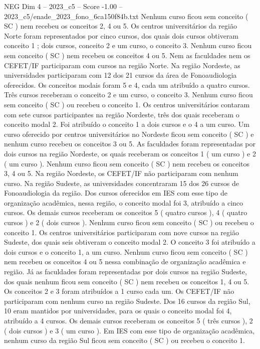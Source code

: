 \begin{textsample}{NEG Dim 4 – 2023\_c5 – Score -1.00 – 2023\_c5/enade\_2023\_fono\_6ca150f84b.txt}
Nenhum curso ficou sem conceito ( SC ) nem recebeu os conceitos 2, 4 ou 5.
Os centros universitários da região Norte foram representados por cinco cursos, dos quais dois cursos obtiveram conceito 1 ; dois cursos, conceito 2 e um curso, o conceito 3.
Nenhum curso ficou sem conceito ( SC ) nem recebeu os conceitos 4 ou 5.
Nem as faculdades nem os CEFET/IF participaram com cursos na região Norte.
Na região Nordeste, as universidades participaram com 12 dos 21 cursos da área de Fonoaudiologia oferecidos.
Os conceitos modais foram 5 e 4, cada um atribuído a quatro cursos.
Três cursos receberam o conceito 2 e um curso, o conceito 3.
Nenhum curso ficou sem conceito ( SC ) ou recebeu o conceito 1.
Os centros universitários contaram com sete cursos participantes na região Nordeste, três dos quais receberam o conceito modal 2.
Foi atribuído o conceito 1 a dois cursos e o 4 a um curso.
Um curso oferecido por centros universitários no Nordeste ficou sem conceito ( SC ) e nenhum curso recebeu os conceitos 3 ou 5.
As faculdades foram representadas por dois cursos na região Nordeste, os quais receberam os conceitos 1 ( um curso ) e 2 ( um curso ).
Nenhum curso ficou sem conceito ( SC ) nem recebeu os conceitos 3, 4 ou 5.
Na região Nordeste, os CEFET/IF não participaram com nenhum curso.
Na região Sudeste, as universidades concentraram 15 dos 26 cursos de Fonoaudiologia da região.
Dos cursos oferecidos em IES com esse tipo de organização acadêmica, nessa região, o conceito modal foi 3, atribuído a cinco cursos.
Os demais cursos receberam os conceitos 5 ( quatro cursos ), 4 ( quatro cursos ) e 2 ( dois cursos ).
Nenhum curso ficou sem conceito ( SC ) ou recebeu o conceito 1.
Os centros universitários participaram com nove cursos na região Sudeste, dos quais seis obtiveram o conceito modal 2.
O conceito 3 foi atribuído a dois cursos e o conceito 1, a um curso.
Nenhum curso ficou sem conceito ( SC ) nem recebeu os conceitos 4 ou 5 nessa combinação de organização acadêmica e região.
Já as faculdades foram representadas por dois cursos na região Sudeste, dos quais nenhum ficou sem conceito ( SC ) nem recebeu os conceitos 1, 4 ou 5.
Os conceitos 2 e 3 foram atribuídos a 1 curso cada um.
Os CEFET/IF não participaram com nenhum curso na região Sudeste.
Dos 16 cursos da região Sul, 10 eram mantidos por universidades, para os quais o conceito modal foi 4, atribuído a 4 cursos.
Os demais cursos receberam os conceitos 5 ( três cursos ), 2 ( dois cursos ) e 3 ( um curso ).
Em IES com esse tipo de organização acadêmica, nenhum curso da região Sul ficou sem conceito ( SC ) ou recebeu o conceito 1.

\end{textsample}
